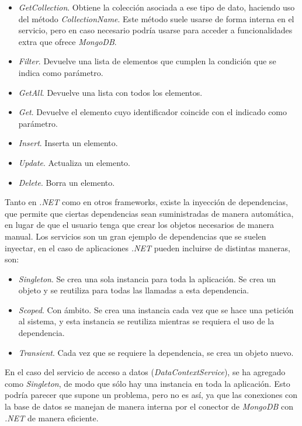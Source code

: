 \begin{itemize}
	\item \textit{GetCollection}. Obtiene la colección asociada a ese tipo de dato, haciendo uso del método \textit{CollectionName}. Este método suele usarse de forma interna en el servicio, pero en caso necesario podría usarse para acceder a funcionalidades extra que ofrece \textit{MongoDB}.
	\item \textit{Filter}. Devuelve una lista de elementos que cumplen la condición que se indica como parámetro.
	\item \textit{GetAll}. Devuelve una lista con todos los elementos.
	\item \textit{Get}. Devuelve el elemento cuyo identificador coincide con el indicado como parámetro.
	\item \textit{Insert}. Inserta un elemento.
	\item \textit{Update}. Actualiza un elemento.
	\item \textit{Delete}. Borra un elemento.
\end{itemize}

Tanto en \textit{.NET} como en otros frameworks, existe la inyección de dependencias, que permite que ciertas dependencias sean suministradas de manera automática, en lugar de que el usuario tenga que crear los objetos necesarios de manera manual. Los servicios son un gran ejemplo de dependencias que se suelen inyectar, en el caso de aplicaciones \textit{.NET} pueden incluirse de distintas maneras, son:

\begin{itemize}
	\item \textit{Singleton}. Se crea una sola instancia para toda la aplicación. Se crea un objeto y se reutiliza para todas las llamadas a esta dependencia.
	\item \textit{Scoped}. Con ámbito. Se crea una instancia cada vez que se hace una petición al sistema, y esta instancia se reutiliza mientras se requiera el uso de la dependencia.
	\item \textit{Transient}. Cada vez que se requiere la dependencia, se crea un objeto nuevo.
\end{itemize}

En el caso del servicio de acceso a datos (\textit{DataContextService}), se ha agregado como \textit{Singleton}, de modo que sólo hay una instancia en toda la aplicación. Esto podría parecer que supone un problema, pero no es así, ya que las conexiones con la base de datos se manejan de manera interna por el conector de \textit{MongoDB} con \textit{.NET} de manera eficiente.


